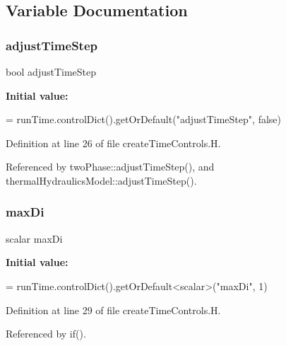 \label{_Description}%


\subsection{Variable Documentation}
\mbox{\label{createTimeControls_8H_ad3a700e1652b37d5382eaeda5cbf3824}} 
\subsubsection{\texorpdfstring{adjust\+Time\+Step}{adjustTimeStep}}
{\footnotesize\ttfamily bool adjust\+Time\+Step}

{\bfseries Initial value\+:}
\begin{DoxyCode}
=
    runTime.controlDict().getOrDefault(\textcolor{stringliteral}{"adjustTimeStep"}, \textcolor{keyword}{false})
\end{DoxyCode}


Definition at line 26 of file create\+Time\+Controls.\+H.



Referenced by two\+Phase\+::adjust\+Time\+Step(), and thermal\+Hydraulics\+Model\+::adjust\+Time\+Step().

\mbox{\label{createTimeControls_8H_ae61c09755fb5d20a517859f226f5e805}} 
\subsubsection{\texorpdfstring{max\+Di}{maxDi}}
{\footnotesize\ttfamily scalar max\+Di}

{\bfseries Initial value\+:}
\begin{DoxyCode}
=
    runTime.controlDict().getOrDefault<scalar>(\textcolor{stringliteral}{"maxDi"}, 1)
\end{DoxyCode}


Definition at line 29 of file create\+Time\+Controls.\+H.



Referenced by if().

\mbox{\label{createTimeControls_8H_a7f6739b865c2d5e693900f678f68117a}} 

